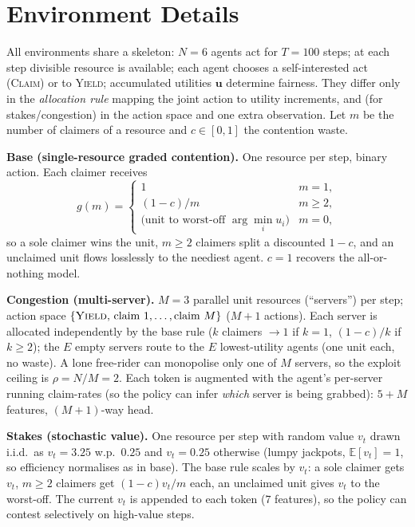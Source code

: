 \documentclass[conference, a4paper]{IEEEtran}
\begin{document}
\appendices
\section{Environment Details}
All environments share a skeleton: $N{=}6$ agents act for $T{=}100$ steps; at each
step divisible resource is available; each agent chooses a self-interested act
(\textsc{Claim}) or to \textsc{Yield}; accumulated utilities $\mathbf{u}$ determine
fairness. They differ only in the \emph{allocation rule} mapping the joint action to
utility increments, and (for stakes/congestion) in the action space and one extra
observation. Let $m$ be the number of claimers of a resource and $c\in[0,1]$ the
contention waste.

\textbf{Base (single-resource graded contention).} One resource per step, binary
action. Each claimer receives
\begin{equation*}
g(m)=\begin{cases}
1 & m{=}1,\\
(1{-}c)/m & m\ge 2,\\
\text{(unit to worst-off } \arg\min_i u_i) & m{=}0,
\end{cases}
\end{equation*}
so a sole claimer wins the unit, $m\ge2$ claimers split a discounted $1{-}c$, and an
unclaimed unit flows losslessly to the neediest agent. $c{=}1$ recovers the
all-or-nothing model.

\textbf{Congestion (multi-server).} $M{=}3$ parallel unit resources (``servers'')
per step; action space $\{\textsc{Yield},\,\text{claim }1,\dots,\text{claim }M\}$
($M{+}1$ actions). Each server is allocated independently by the base rule ($k$
claimers $\!\to\!1$ if $k{=}1$, $(1{-}c)/k$ if $k\ge2$); the $E$ empty servers route
to the $E$ lowest-utility agents (one unit each, no waste). A lone free-rider can
monopolise only one of $M$ servers, so the exploit ceiling is $\rho{=}N/M{=}2$. Each
token is augmented with the agent's per-server running claim-rates (so the policy
can infer \emph{which} server is being grabbed): $5{+}M$ features, $(M{+}1)$-way
head.

\textbf{Stakes (stochastic value).} One resource per step with random value $v_t$
drawn i.i.d.\ as $v_t{=}3.25$ w.p.\ $0.25$ and $v_t{=}0.25$ otherwise (lumpy
jackpots, $\mathbb{E}[v_t]{=}1$, so efficiency normalises as in base). The base rule
scales by $v_t$: a sole claimer gets $v_t$, $m\ge2$ claimers get $(1{-}c)v_t/m$ each,
an unclaimed unit gives $v_t$ to the worst-off. The current $v_t$ is appended to each
token ($7$ features), so the policy can contest selectively on high-value steps.
\end{document}
